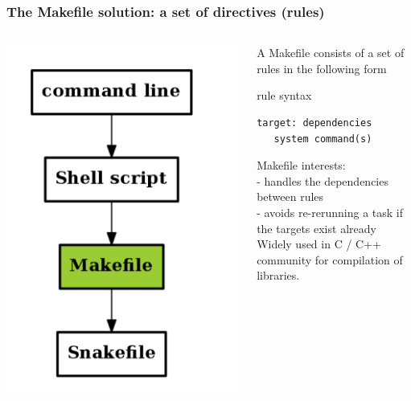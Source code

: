 \documentclass{beamer}
\begin{document}
\begin{frame}[fragile]
  \frametitle{The Makefile solution: a set of directives (rules)}

   \begin{columns}
 \begin{column}[T]{3cm}
 \includegraphics[width=1\textwidth, height=0.6\textheight]{images/flow_methods_3.png}
 \end{column}
  \begin{column}[T]{9cm}  
  A Makefile consists of a set of rules in the following form 
  \begin{block}{rule syntax}
  \begin{lstlisting}
target: dependencies
   system command(s)
   \end{lstlisting}
   \end{block}
   Makefile interests:\\
     - handles the dependencies between rules\\
     - avoids re-rerunning a task if the targets exist already\\   
   Widely used in C / C++ community for compilation of libraries. 
   \end{column}
   \end{columns}   
\end{frame}
\end{document}
